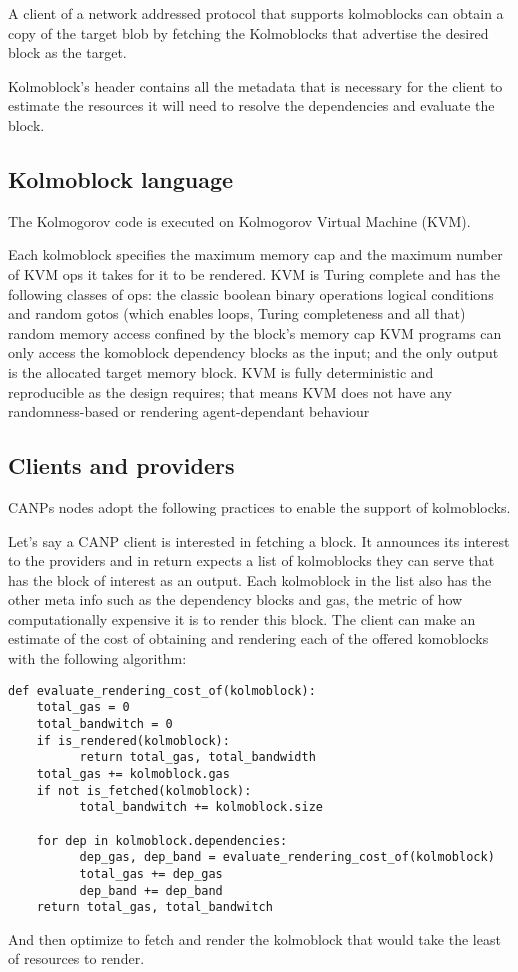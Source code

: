 \documentclass[twocolumn,aps,pra,floatfix]{revtex4-1}
\begin{document}
A client of a network addressed protocol that supports kolmoblocks can obtain a copy of the target blob by fetching the Kolmoblocks that advertise the desired block as the target.

Kolmoblock's header contains all the metadata that is necessary for the client to estimate the resources it will need to resolve the dependencies and evaluate the block. 

\subsection{Kolmoblock language}
The Kolmogorov code is executed on Kolmogorov Virtual Machine (KVM). 

Each kolmoblock specifies the maximum memory cap and the maximum number of KVM ops it takes for it to be rendered.  
KVM is Turing complete and has the following classes of ops:
the classic boolean binary operations
logical conditions and random gotos (which enables loops, Turing completeness and all that)
random memory access confined by the block's memory cap
KVM programs can only access the komoblock dependency blocks as the input; and the only output is the allocated target memory block.
KVM is fully deterministic and reproducible as the design requires; that means KVM does not have any randomness-based or rendering agent-dependant behaviour    

\subsection{Clients and providers}
CANPs nodes adopt the following practices to enable the support of kolmoblocks.

Let's say a CANP client is interested in fetching a block. It announces its interest to the providers and in return expects a list of kolmoblocks they can serve that has the block of interest as an output. 
Each kolmoblock in the list also has the other meta info such as the dependency blocks and gas, the metric of how computationally expensive it is to render this block. 
The client can make an estimate of the cost of obtaining and rendering each of the offered komoblocks with the following algorithm:

\begin{widetext}
\begin{lstlisting}
def evaluate_rendering_cost_of(kolmoblock):
    total_gas = 0
    total_bandwitch = 0
    if is_rendered(kolmoblock):
          return total_gas, total_bandwidth
    total_gas += kolmoblock.gas
    if not is_fetched(kolmoblock):
          total_bandwitch += kolmoblock.size

    for dep in kolmoblock.dependencies:
          dep_gas, dep_band = evaluate_rendering_cost_of(kolmoblock)
          total_gas += dep_gas
          dep_band += dep_band
    return total_gas, total_bandwitch
\end{lstlisting}
\end{widetext}
And then optimize to fetch and render the kolmoblock that would take the least of resources to render.
\end{document}
